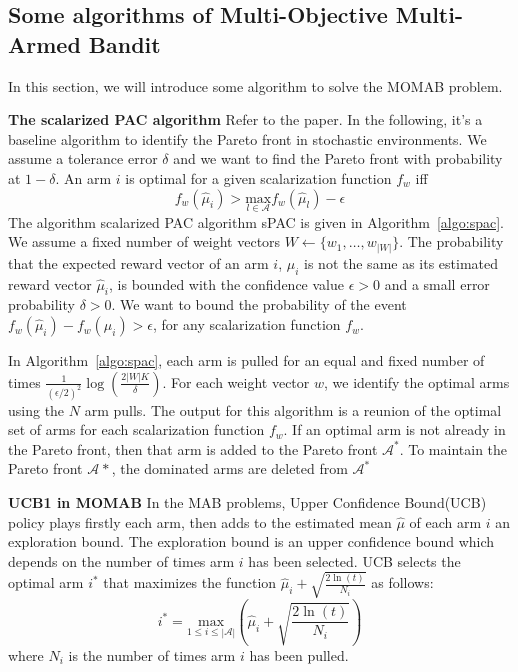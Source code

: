 \subsection{Some algorithms of Multi-Objective Multi-Armed Bandit}
\label{subsec:MOMABE}
In this section, we will introduce some algorithm to solve the MOMAB problem. 

\vspace{3ex}
\textbf{The scalarized PAC algorithm}
Refer to the paper\cite{drugan2015linear}. In the following, it's a baseline algorithm to identify the Pareto front in stochastic environments. We assume a tolerance error $\delta$ and we want to find the Pareto front with probability at $1-\delta$. An arm $i$ is optimal for a given scalarization function $f_w$ iff
\[f_w(\hat{\mu}_i) > \underset{l\in \mathscr{A}}{\text{max}}f_w(\hat{\mu}_l) - \epsilon\]
The algorithm scalarized PAC algorithm sPAC is given in Algorithm~\ref{algo:spac}. We assume a fixed number of weight vectors $W\leftarrow \{w_1,\dots,w_{|W|}\}$. The probability that the expected reward vector of an arm $i$, $\mu_i$ is not the same as its estimated reward vector $\hat{\mu}_i$, is bounded with the confidence value $\epsilon>0$ and a small error probability $\delta>0$. We want to bound the probability of the event $f_w(\hat{\mu}_i)- f_w(\mu_i) > \epsilon$, for any scalarization function $f_w$.

In Algorithm~\ref{algo:spac}, each arm is pulled for an equal and fixed number of times $\frac{1}{(\epsilon/2)^2}\log{(\frac{2|W|K}{\delta})}$. For each weight vector $w$, we identify the optimal arms using the $N$ arm pulls. The output for this algorithm is a reunion of the optimal set of arms for each scalarization function $f_w$. If an optimal arm is not already in the Pareto front, then that arm is added to the Pareto front $\mathscr{A}^{\ast}$. To maintain the Pareto front $\mathscr{A}^{}\ast$, the dominated arms are deleted from $\mathscr{A}^{\ast}$


\vspace{3ex}
\textbf{UCB1 in MOMAB} 
In the MAB problems, Upper Confidence Bound(UCB) policy \cite{Auer02Finite} plays firstly each arm, then adds to the estimated mean $\hat{\mu}$ of each arm $i$ an exploration bound. The exploration bound is an upper confidence bound which depends on the number of times arm $i$ has been selected. UCB selects the optimal arm $i^{\ast}$ that maximizes the function $\hat{\mu}_i + \sqrt{\frac{2\ln{(t)}}{N_i}}$ as follows:
\[i^{\ast} = \underset{1\leqslant i\leqslant |\mathscr{A}|}{\text{max}}\left(\hat{\mu}_i + \sqrt{\frac{2\ln{(t)}}{N_i}}\right)\]
where $N_i$ is the number of times arm $i$ has been pulled. 

